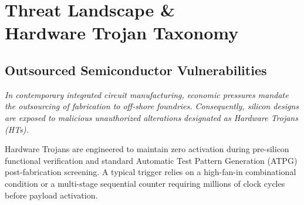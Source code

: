 \documentclass[11pt,a4paper,oneside]{book}
\begin{document}
\chapter[Threat Landscape \& Hardware Trojan Taxonomy]{Threat Landscape \&\\ Hardware Trojan Taxonomy}

\section{Outsourced Semiconductor Vulnerabilities}

{\itshape
In contemporary integrated circuit manufacturing, economic pressures mandate the outsourcing of fabrication to off-shore foundries. Consequently, silicon designs are exposed to malicious unauthorized alterations designated as Hardware Trojans (HTs).
}

Hardware Trojans are engineered to maintain zero activation during pre-silicon functional verification and standard Automatic Test Pattern Generation (ATPG) post-fabrication screening. A typical trigger relies on a high-fan-in combinational condition or a multi-stage sequential counter requiring millions of clock cycles before payload activation.
\end{document}

